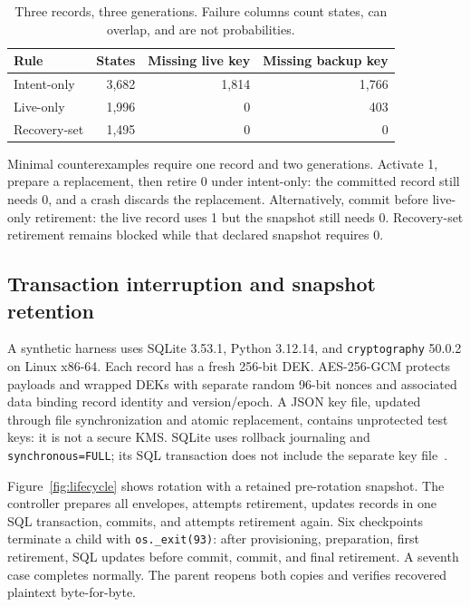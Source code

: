 \documentclass[10pt,conference]{IEEEtran}
\begin{document}
\begin{table}[t]
\caption{Three records, three generations. Failure columns count states, can overlap, and are not probabilities.}
\label{tab:model}\centering
\begin{tabular}{@{}lrrr@{}}
\toprule
Rule & States & Missing live key & Missing backup key\\
\midrule
Intent-only & 3,682 & 1,814 & 1,766\\
Live-only & 1,996 & 0 & 403\\
Recovery-set & 1,495 & 0 & 0\\
\bottomrule
\end{tabular}
\end{table}

Minimal counterexamples require one record and two generations. Activate 1, prepare a replacement, then retire 0 under intent-only: the committed record still needs 0, and a crash discards the replacement. Alternatively, commit before live-only retirement: the live record uses 1 but the snapshot still needs 0. Recovery-set retirement remains blocked while that declared snapshot requires 0.

\subsection{Transaction interruption and snapshot retention}
A synthetic harness uses SQLite 3.53.1, Python 3.12.14, and \texttt{cryptography} 50.0.2 on Linux x86-64. Each record has a fresh 256-bit DEK. AES-256-GCM protects payloads and wrapped DEKs with separate random 96-bit nonces and associated data binding record identity and version/epoch. A JSON key file, updated through file synchronization and atomic replacement, contains unprotected test keys: it is not a secure KMS. SQLite uses rollback journaling and \texttt{synchronous=FULL}; its SQL transaction does not include the separate key file~\cite{sqlite}.

Figure~\ref{fig:lifecycle} shows rotation with a retained pre-rotation snapshot. The controller prepares all envelopes, attempts retirement, updates records in one SQL transaction, commits, and attempts retirement again. Six checkpoints terminate a child with \texttt{os.\_exit(93)}: after provisioning, preparation, first retirement, SQL updates before commit, commit, and final retirement. A seventh case completes normally. The parent reopens both copies and verifies recovered plaintext byte-for-byte.
\end{document}
